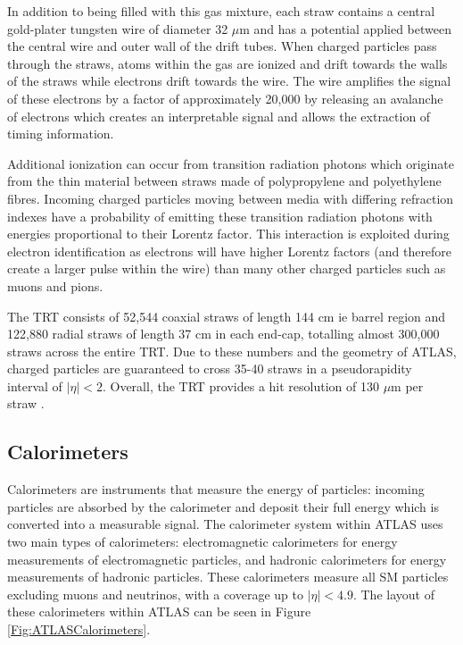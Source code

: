 \documentclass[12pt,a4paper,epsf,portrait,times,epsfig]{report}
\begin{document}
		In addition to being filled with this gas mixture, each straw contains a central gold-plater tungsten wire of diameter 32 $\mu$m and has a potential applied between the central wire and outer wall of the drift tubes. When charged particles pass through the straws, atoms within the gas are ionized and drift towards the walls of the straws while electrons drift towards the wire. The wire amplifies the signal of these electrons by a factor of approximately 20,000 by releasing an avalanche of electrons which creates an interpretable signal and allows the extraction of timing information. \par

		Additional ionization can occur from transition radiation photons which originate from the thin material between straws made of polypropylene and polyethylene fibres. Incoming charged particles moving between media with differing refraction indexes have a probability of emitting these transition radiation photons with energies proportional to their Lorentz factor. This interaction is exploited during electron identification as electrons will have higher Lorentz factors (and therefore create a larger pulse within the wire) than many other charged particles such as muons and pions. \par

		The TRT consists of 52,544 coaxial straws of length 144 cm ie barrel region and 122,880 radial straws of length 37 cm in each end-cap, totalling almost 300,000 straws across the entire TRT. Due to these numbers and the geometry of ATLAS, charged particles are guaranteed to cross 35-40 straws in a pseudorapidity interval of $|\eta| < 2$. Overall, the TRT provides a hit resolution of 130 $\mu$m per straw \cite{ATLASTRTRes}. 

		\subsection{Calorimeters}\label{Section:Calorimeters}

		Calorimeters are instruments that measure the energy of particles: incoming particles are absorbed by the calorimeter and deposit their full energy which is converted into a measurable signal. The calorimeter system within ATLAS uses two main types of calorimeters: electromagnetic calorimeters for energy measurements of electromagnetic particles, and hadronic calorimeters for energy measurements of hadronic particles. These calorimeters measure all SM particles excluding muons and neutrinos, with a coverage up to $|\eta| < 4.9$. The layout of these calorimeters within ATLAS can be seen in Figure \ref{Fig:ATLASCalorimeters}. \par
\end{document}
